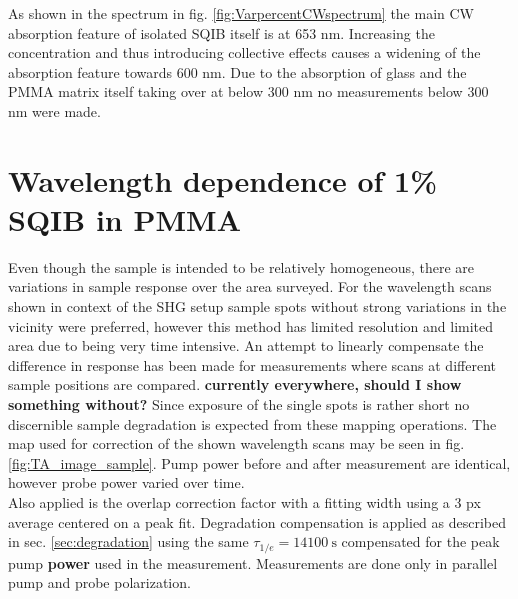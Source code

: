 \documentclass[twoside,openright]{scrreprt}
\begin{document}
{As shown in the spectrum in fig. \ref{fig:VarpercentCWspectrum} the main CW absorption feature of isolated SQIB itself is at 653 nm. Increasing the concentration and thus introducing collective effects causes a widening of the absorption feature towards 600 nm. Due to the absorption of glass and the PMMA matrix itself taking over at below 300 nm no measurements below 300 nm were made.\\

\section{Wavelength dependence of 1\% SQIB in PMMA}


Even though the sample is intended to be relatively homogeneous, there are variations in sample response over the area surveyed. For the wavelength scans shown in context of the SHG setup sample spots without strong variations in the vicinity were preferred, however this method has limited resolution and limited area due to being very time intensive. An attempt to linearly compensate the difference in response has been made for measurements where scans at different sample positions are compared. \textbf{currently everywhere, should I show something without?} Since exposure of the single spots is rather short no discernible sample degradation is expected from these mapping operations. The map used for correction of the shown wavelength scans may be seen in fig. \ref{fig:TA_image_sample}. Pump power before and after measurement are identical, however probe power varied over time.\\
Also applied is the overlap correction factor with a fitting width using a 3 px average centered on a peak fit. Degradation compensation is applied as described in sec. \ref{sec:degradation} using the same $\tau_{1/e} = \SI{14100}{\second}$ compensated for the peak pump \textbf{power} used in the measurement.
Measurements are done only in parallel pump and probe polarization.

}
\end{document}
